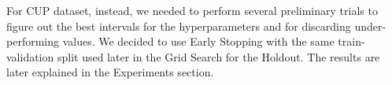 For CUP dataset, instead, we needed to perform several preliminary trials to figure out the best intervals for the hyperparameters and for discarding under-performing values. We decided to use Early Stopping with the same train-validation split used later in the Grid Search for the Holdout. The results are later explained in the Experiments section.

